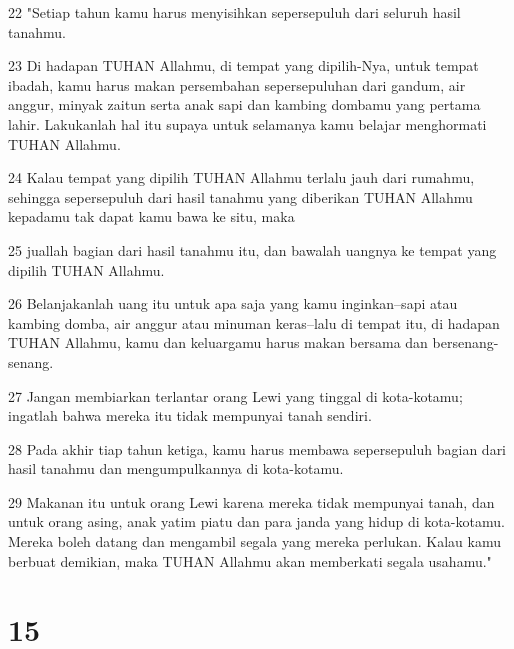 \par 22 "Setiap tahun kamu harus menyisihkan sepersepuluh dari seluruh hasil tanahmu.
\par 23 Di hadapan TUHAN Allahmu, di tempat yang dipilih-Nya, untuk tempat ibadah, kamu harus makan persembahan sepersepuluhan dari gandum, air anggur, minyak zaitun serta anak sapi dan kambing dombamu yang pertama lahir. Lakukanlah hal itu supaya untuk selamanya kamu belajar menghormati TUHAN Allahmu.
\par 24 Kalau tempat yang dipilih TUHAN Allahmu terlalu jauh dari rumahmu, sehingga sepersepuluh dari hasil tanahmu yang diberikan TUHAN Allahmu kepadamu tak dapat kamu bawa ke situ, maka
\par 25 juallah bagian dari hasil tanahmu itu, dan bawalah uangnya ke tempat yang dipilih TUHAN Allahmu.
\par 26 Belanjakanlah uang itu untuk apa saja yang kamu inginkan--sapi atau kambing domba, air anggur atau minuman keras--lalu di tempat itu, di hadapan TUHAN Allahmu, kamu dan keluargamu harus makan bersama dan bersenang-senang.
\par 27 Jangan membiarkan terlantar orang Lewi yang tinggal di kota-kotamu; ingatlah bahwa mereka itu tidak mempunyai tanah sendiri.
\par 28 Pada akhir tiap tahun ketiga, kamu harus membawa sepersepuluh bagian dari hasil tanahmu dan mengumpulkannya di kota-kotamu.
\par 29 Makanan itu untuk orang Lewi karena mereka tidak mempunyai tanah, dan untuk orang asing, anak yatim piatu dan para janda yang hidup di kota-kotamu. Mereka boleh datang dan mengambil segala yang mereka perlukan. Kalau kamu berbuat demikian, maka TUHAN Allahmu akan memberkati segala usahamu."

\chapter{15}

